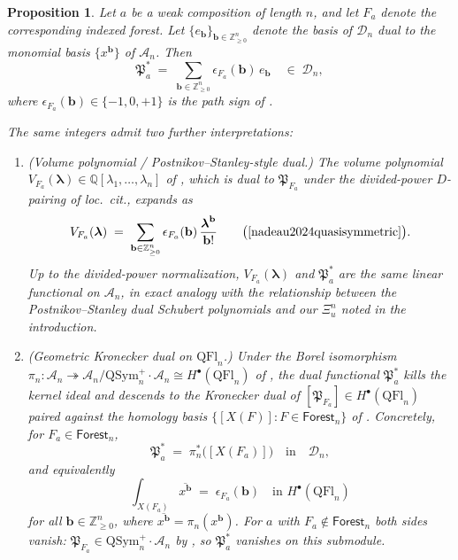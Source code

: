 \documentclass{amsart}
\newtheorem{proposition}[lemma]{Proposition}
\theoremstyle{definition}
\theoremstyle{remark}
\numberwithin{equation}{subsection}
\newcommand{\dsch}{\ensuremath{\Xi}}
\newcommand{\coma}{\mathcal{A}}
\newcommand{\dcoma}{\mathcal{D}}
\newcommand{\forest}{\mathfrak{P}}
\begin{document}
\begin{proposition}\label{proposition:forestdualcoefficients}
Let $a$ be a weak composition of length $n$, and let $F_a$ denote the corresponding indexed forest. Let $\{e_{\mathbf{b}}\}_{\mathbf{b}\in \mathbb{Z}_{\geq 0}^n}$ denote the basis of $\dcoma_n$ dual to the monomial basis $\{x^{\mathbf{b}}\}$ of $\coma_n$. Then
$$\forest_a^* \;=\; \sum_{\mathbf{b}\in \mathbb{Z}_{\geq 0}^n} \epsilon_{F_a}(\mathbf{b})\,e_{\mathbf{b}}\quad\in\;\dcoma_n,$$
where $\epsilon_{F_a}(\mathbf{b})\in\{-1,0,+1\}$ is the path sign of \cite[Proposition~10.15]{nadeau2024quasisymmetric}.

The same integers admit two further interpretations:
\begin{enumerate}
\item (Volume polynomial / Postnikov--Stanley-style dual.) The volume polynomial $V_{F_a}(\boldsymbol\lambda)\in\mathbb{Q}[\lambda_1,\ldots,\lambda_n]$ of \cite[Section~10.5]{nadeau2024quasisymmetric}, which is dual to $\forest_{F_a}$ under the divided-power $D$-pairing of \emph{loc.~cit.}, expands as
$$V_{F_a}(\boldsymbol\lambda) \;=\; \sum_{\mathbf{b}\in\mathbb{Z}_{\geq 0}^n} \epsilon_{F_a}(\mathbf{b})\,\frac{\boldsymbol\lambda^{\mathbf{b}}}{\mathbf{b}!}\qquad\bigl(\text{\cite[Proposition~10.14]{nadeau2024quasisymmetric}}\bigr).$$
Up to the divided-power normalization, $V_{F_a}(\boldsymbol\lambda)$ and $\forest_a^*$ are the same linear functional on $\coma_n$, in exact analogy with the relationship between the Postnikov--Stanley dual Schubert polynomials \cite{postnikov2009chains} and our $\dsch_u^n$ noted in the introduction.

\item (Geometric Kronecker dual on $\mathrm{QFl}_n$.) Under the Borel isomorphism $\pi_n:\coma_n\twoheadrightarrow \coma_n/\mathrm{QSym}_n^+\cdot\coma_n \cong H^\bullet(\mathrm{QFl}_n)$ of \cite[Theorem~A and Corollary~12.5]{bergeron2025qsymflag}, the dual functional $\forest_a^*$ kills the kernel ideal and descends to the Kronecker dual of $[\forest_{F_a}]\in H^\bullet(\mathrm{QFl}_n)$ paired against the homology basis $\{[X(F)]:F\in\mathsf{Forest}_n\}$ of \cite[Corollary~11.6]{bergeron2025qsymflag}. Concretely, for $F_a\in\mathsf{Forest}_n$,
$$\forest_a^*\;=\;\pi_n^*\bigl([X(F_a)]\bigr) \quad\text{in}\quad \dcoma_n,$$
and equivalently
$$\int_{X(F_a)}\!\overline{x^{\mathbf{b}}} \;=\; \epsilon_{F_a}(\mathbf{b})\quad \text{in } H^\bullet(\mathrm{QFl}_n)$$
for all $\mathbf{b}\in\mathbb{Z}_{\geq 0}^n$, where $\overline{x^{\mathbf{b}}}=\pi_n(x^{\mathbf{b}})$. For $a$ with $F_a\not\in\mathsf{Forest}_n$ both sides vanish: $\forest_{F_a}\in \mathrm{QSym}_n^+\cdot\coma_n$ by \cite[Theorem~9.7]{nadeau2024quasisymmetric}, so $\forest_a^*$ vanishes on this submodule.
\end{enumerate}
\end{proposition}
\end{document}

